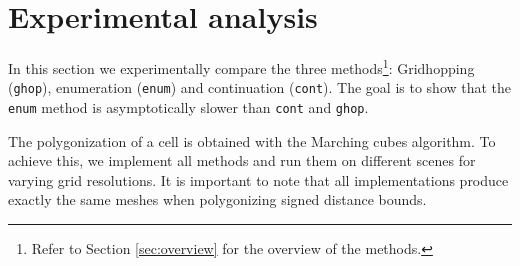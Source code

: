 \documentclass[11pt,twocolumn]{article}
\begin{document}
	\section{Experimental analysis}\label{sec:experiments}
		In this section we experimentally compare the three methods\footnote{Refer to Section \ref{sec:overview} for the overview of the methods.}: Gridhopping (\texttt{ghop}), enumeration (\texttt{enum}) and continuation (\texttt{cont}).
		The goal is to show that the \texttt{enum} method is asymptotically slower than \texttt{cont} and \texttt{ghop}.

		The polygonization of a cell is obtained with the Marching cubes algorithm.
		To achieve this, we implement all methods and run them on different scenes for varying grid resolutions.
		It is important to note that all implementations produce exactly the same meshes when polygonizing signed distance bounds.
\end{document}
